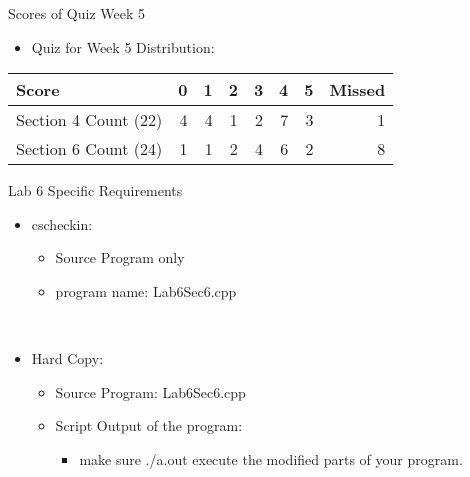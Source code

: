 \documentclass[presentation]{beamer}
\begin{document}
\begin{frame}[label=sec-4]{Scores of Quiz Week 5}
\\
\begin{itemize}
\item \alert{Quiz for Week 5} Distribution:
\end{itemize}
\begin{center}
\begin{tabular}{lrrrrrrr}
\hline
Score & 0 & 1 & 2 & 3 & 4 & 5 & Missed\\
\hline
Section \alert{4} Count (22) & 4 & 4 & 1 & 2 & 7 & 3 & 1\\
\hline
Section \alert{6} Count (24) & 1 & 1 & 2 & 4 & 6 & 2 & 8\\
\hline
\end{tabular}
\end{center}
\end{frame}

\begin{frame}[label=sec-5]{Lab 6 Specific Requirements}
\begin{itemize}
\item \alert{cscheckin}:
\begin{itemize}
\item \alert{Source Program} only
\item program name: \alert{Lab6Sec6.cpp}
\end{itemize}
\end{itemize}
\\
\begin{itemize}
\item \alert{Hard Copy}:
\begin{itemize}
\item \alert{Source Program}: Lab6Sec6.cpp
\item \alert{Script Output} of the program: 
\begin{itemize}
\item make sure \alert{./a.out} execute the modified parts of your program.
\end{itemize}
\end{itemize}
\end{itemize}
\end{frame}
\end{document}
